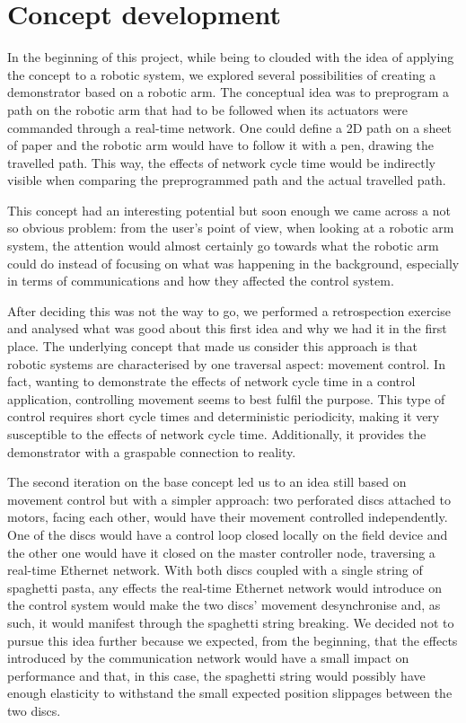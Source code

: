 \section{Concept development}

In the beginning of this project, while being to clouded with the idea of applying the concept to a robotic system, we explored several possibilities of creating a demonstrator based on a robotic arm.
The conceptual idea was to preprogram a path on the robotic arm that had to be followed when its actuators were commanded through a real-time network.
One could define a 2D path on a sheet of paper and the robotic arm would have to follow it with a pen, drawing the travelled path.
This way, the effects of network cycle time would be indirectly visible when comparing the preprogrammed path and the actual travelled path.

This concept had an interesting potential but soon enough we came across a not so obvious problem: from the user's point of view, when looking at a robotic arm system, the attention would almost certainly go towards what the robotic arm could do instead of focusing on what was happening in the background, especially in terms of communications and how they affected the control system.

After deciding this was not the way to go, we performed a retrospection exercise and analysed what was good about this first idea and why we had it in the first place.
The underlying concept that made us consider this approach is that robotic systems are characterised by one traversal aspect: movement control.
In fact, wanting to demonstrate the effects of network cycle time in a control application, controlling movement seems to best fulfil the purpose.
This type of control requires short cycle times and deterministic periodicity, making it very susceptible to the effects of network cycle time.
Additionally, it provides the demonstrator with a graspable connection to reality.

The second iteration on the base concept led us to an idea still based on movement control but with a simpler approach: two perforated discs attached to motors, facing each other, would have their movement controlled independently.
One of the discs would have a control loop closed locally on the field device and the other one would have it closed on the master controller node, traversing a real-time Ethernet network.
With both discs coupled with a single string of spaghetti pasta, any effects the real-time Ethernet network would introduce on the control system would make the two discs' movement desynchronise and, as such, it would manifest through the spaghetti string breaking.
We decided not to pursue this idea further because we expected, from the beginning, that the effects introduced by the communication network would have a small impact on performance and that, in this case, the spaghetti string would possibly have enough elasticity to withstand the small expected position slippages between the two discs.

